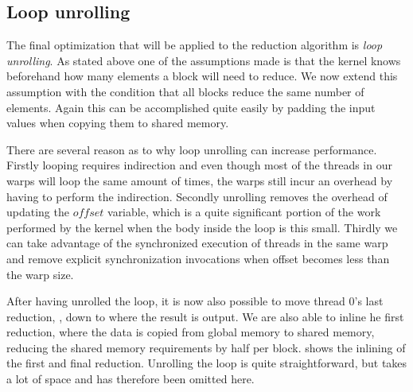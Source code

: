 \subsection{Loop unrolling}\label{sec:loopUnrolling}


The final optimization that will be applied to the reduction algorithm is
\textit{loop unrolling}. As stated above one of the assumptions made is that the
kernel knows beforehand how many elements a block will need to reduce. We now
extend this assumption with the condition that all blocks reduce the same number
of elements. Again this can be accomplished quite easily by padding the input
values when copying them to shared memory.

There are several reason as to why loop unrolling can increase
performance. Firstly looping requires indirection and even though most of the
threads in our warps will loop the same amount of times, the warps still incur
an overhead by having to perform the indirection. Secondly unrolling removes the
overhead of updating the $offset$ variable, which is a quite significant portion
of the work performed by the kernel when the body inside the loop is this
small. Thirdly we can take advantage of the synchronized execution of threads in
the same warp and remove explicit synchronization invocations when offset
becomes less than the warp size.


After having unrolled the loop, it is now also possible to move thread
0's last reduction, , down to where the
result is output. We are also able to inline he first reduction, where
the data is copied from global memory to shared memory, reducing the
shared memory requirements by half per
block.  shows the inlining of the first and
final reduction. Unrolling the loop is quite straightforward, but
takes a lot of space and has therefore been omitted here.


